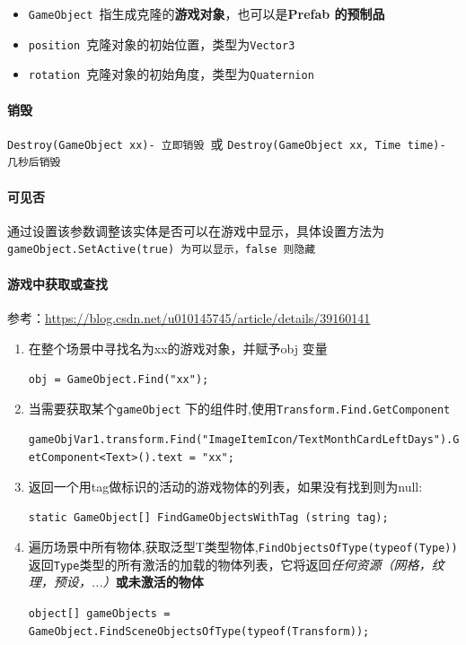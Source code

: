 \documentclass[UTF8,a4paper,12pt]{ctexbook}
\begin{document}
			\begin{itemize}
				\item \verb|GameObject |指生成克隆的\textbf{游戏对象}，也可以是\textbf{Prefab 的预制品}
				\item \verb|position |克隆对象的初始位置，类型为\verb|Vector3|
				\item \verb|rotation |克隆对象的初始角度，类型为\verb|Quaternion|
			\end{itemize} 
		
		\paragraph{销毁}
			\verb|Destroy(GameObject xx)- 立即销毁 |或 \verb|Destroy(GameObject xx, Time time)- 几秒后销毁|
			
		\paragraph{可见否}
			通过设置该参数调整该实体是否可以在游戏中显示，具体设置方法为\verb|gameObject.SetActive(true) 为可以显示，false 则隐藏|
		
		\paragraph{游戏中获取或查找}
			参考：\url{https://blog.csdn.net/u010145745/article/details/39160141}
			
			\begin{enumerate}
				\item 在整个场景中寻找名为xx的游戏对象，并赋予obj 变量
					
					\verb|obj = GameObject.Find("xx");|
					
				\item 当需要获取某个\verb|gameObject| 下的组件时,使用\verb|Transform.Find.GetComponent|
					
					\verb|gameObjVar1.transform.Find("ImageItemIcon/TextMonthCardLeftDays").GetComponent<Text>().text = "xx";|
				
				\item 返回一个用tag做标识的活动的游戏物体的列表，如果没有找到则为null: 
				
					\verb|static GameObject[] FindGameObjectsWithTag (string tag);|
				
				\item 遍历场景中所有物体,获取泛型T类型物体,\verb|FindObjectsOfType(typeof(Type))|返回\verb|Type|类型的所有激活的加载的物体列表，它将返回\textit{任何资源（网格，纹理，预设，...）}\textbf{或未激活的物体}
				
					\verb|object[] gameObjects = GameObject.FindSceneObjectsOfType(typeof(Transform));|
			\end{enumerate}
\end{document}
